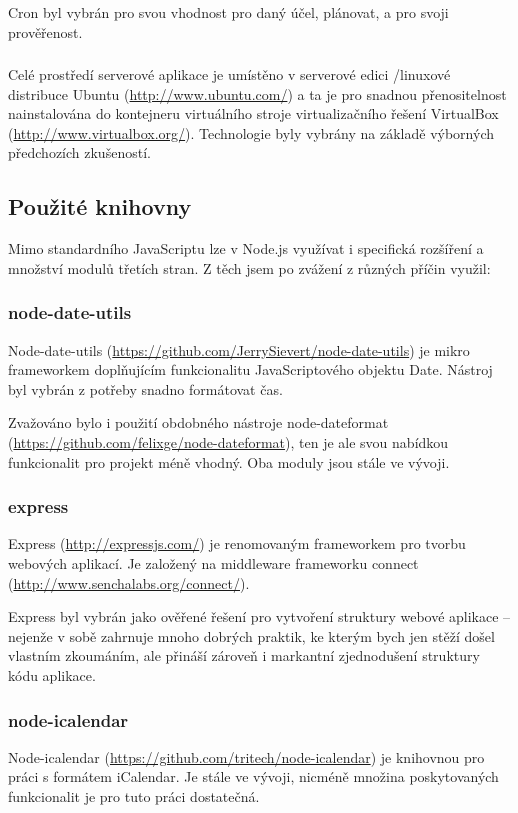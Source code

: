 Cron byl vybrán pro svou vhodnost pro daný účel, plánovat, a pro svoji prověřenost.

\subsubsection*{ }
Celé prostředí serverové aplikace je umístěno v serverové edici /linuxové distribuce Ubuntu (\url{http://www.ubuntu.com/}) a ta je pro snadnou přenositelnost nainstalována do kontejneru virtuálního stroje virtualizačního řešení VirtualBox (\url{http://www.virtualbox.org/}). Technologie byly vybrány na základě výborných předchozích zkušeností.

\subsection{Použité knihovny}
Mimo standardního JavaScriptu lze v Node.js využívat i specifická rozšíření a množství modulů třetích stran. Z těch jsem po zvážení z různých příčin využil:

\subsubsection{node-date-utils}
Node-date-utils (\url{https://github.com/JerrySievert/node-date-utils}) je mikro frameworkem doplňujícím funkcionalitu JavaScriptového objektu Date. Nástroj byl vybrán z potřeby snadno formátovat čas.

Zvažováno bylo i použití obdobného nástroje node-dateformat (\url{https://github.com/felixge/node-dateformat}), ten je ale svou nabídkou funkcionalit pro projekt méně vhodný. Oba moduly jsou stále ve vývoji.

\subsubsection{express}
Express (\url{http://expressjs.com/}) je renomovaným frameworkem pro tvorbu webových aplikací. Je založený na middleware frameworku connect (\url{http://www.senchalabs.org/connect/}).

Express byl vybrán jako ověřené řešení pro vytvoření struktury webové aplikace -- nejenže v sobě zahrnuje mnoho dobrých praktik, ke kterým bych jen stěží došel vlastním zkoumáním, ale přináší zároveň i markantní zjednodušení struktury kódu aplikace.

\subsubsection{node-icalendar}
Node-icalendar (\url{https://github.com/tritech/node-icalendar}) je knihovnou pro práci s formátem iCalendar. Je stále ve vývoji, nicméně množina poskytovaných funkcionalit je pro tuto práci dostatečná.

